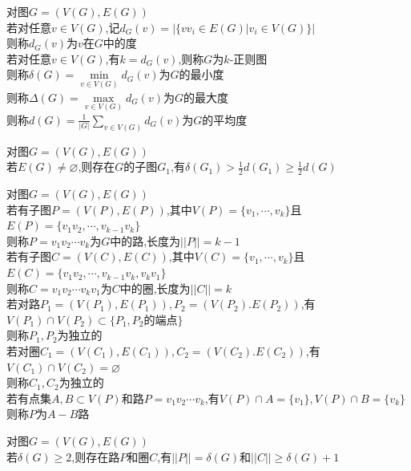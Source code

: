\begin{dingyi}
对图$G=(V(G),E(G))$\\
若对任意$v\in V(G)$,记$d_{G}(v)=|\{vv_i\in E(G)|v_i\in V(G)\}|$\\
则称$d_{G}(v)$为$v$在$G$中的度\\
若对任意$v\in V(G)$,有$k=d_{G}(v)$,则称$G$为$k$-正则图\\
则称$\delta(G)=\min\limits_{v\in V(G)}d_{G}(v)$为$G$的最小度\\
则称$\Delta(G)=\max\limits_{v\in V(G)}d_{G}(v)$为$G$的最大度\\
则称$d(G)=\frac{1}{|G|}\sum\limits_{v\in V(G)}d_{G}(v)$为$G$的平均度
\end{dingyi}

\begin{dingli}
对图$G=(V(G),E(G))$\\
若$E(G)\neq\varnothing$,则存在$G$的子图$G_1$,有$\delta(G_1)> \frac{1}{2}d(G_1)\geq \frac{1}{2}d(G)$
\end{dingli}

\begin{dingyi}
对图$G=(V(G),E(G))$\\
若有子图$P=(V(P),E(P))$,其中$V(P)=\{v_1,\cdots,v_k\}$且$E(P)=\{v_1v_2,\cdots,v_{k-1}v_{k}\}$\\
则称$P=v_1v_2\cdots v_{k}$为$G$中的路,长度为$||P||=k-1$\\
若有子图$C=(V(C),E(C))$,其中$V(C)=\{v_1,\cdots,v_k\}$且$E(C)=\{v_1v_2,\cdots,v_{k-1}v_{k},v_{k}v_1\}$\\
则称$C=v_1v_2\cdots v_{k}v_1$为$C$中的圈,长度为$||C||=k$\\
若对路$P_1=(V(P_1),E(P_1)),P_2=(V(P_2).E(P_2))$,有$V(P_1)\cap V(P_2)\subset\{P_1,P_2\text{的端点}\}$\\
则称$P_1,P_2$为独立的\\
若对圈$C_1=(V(C_1),E(C_1)),C_2=(V(C_2).E(C_2))$,有$V(C_1)\cap V(C_2)=\varnothing$\\
则称$C_1,C_2$为独立的\\
若有点集$A,B\subset V(P)$和路$P=v_1v_2\cdots v_{k}$,有$V(P)\cap A=\{v_1\},V(P)\cap B=\{v_{k}\}$\\
则称$P$为$A-B$路
\end{dingyi}

\begin{dingli}
对图$G=(V(G),E(G))$\\
若$\delta(G)\geq 2$,则存在路$P$和圈$C$,有$||P||=\delta(G)$和$||C||\geq \delta(G)+1$
\end{dingli}

